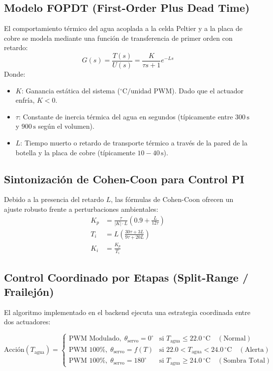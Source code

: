 \documentclass[11pt,letterpaper]{article}
\begin{document}
\subsection{Modelo FOPDT (First-Order Plus Dead Time)}
El comportamiento térmico del agua acoplada a la celda Peltier y a la placa de cobre se modela mediante una función de transferencia de primer orden con retardo:
\begin{equation}
    G(s) = \frac{T(s)}{U(s)} = \frac{K}{\tau s + 1} e^{-L s}
\end{equation}
Donde:
\begin{itemize}
    \item $K$: Ganancia estática del sistema ($^\circ\text{C} / \text{unidad PWM}$). Dado que el actuador enfría, $K < 0$.
    \item $\tau$: Constante de inercia térmica del agua en segundos (típicamente entre $300\,\text{s}$ y $900\,\text{s}$ según el volumen).
    \item $L$: Tiempo muerto o retardo de transporte térmico a través de la pared de la botella y la placa de cobre (típicamente $10 - 40\,\text{s}$).
\end{itemize}

\subsection{Sintonización de Cohen-Coon para Control PI}
Debido a la presencia del retardo $L$, las fórmulas de Cohen-Coon ofrecen un ajuste robusto frente a perturbaciones ambientales:
\begin{align}
    K_p &= \frac{\tau}{|K| \cdot L} \left( 0.9 + \frac{L}{12\tau} \right) \\
    T_i &= L \left( \frac{30\tau + 3L}{9\tau + 20L} \right) \\
    K_i &= \frac{K_p}{T_i}
\end{align}

\subsection{Control Coordinado por Etapas (Split-Range / Frailejón)}
El algoritmo implementado en el backend ejecuta una estrategia coordinada entre dos actuadores:

\begin{equation}
    \text{Acción}(T_{\text{agua}}) = 
    \begin{cases}
        \text{PWM Modulado}, \; \theta_{\text{servo}} = 0^\circ & \text{si } T_{\text{agua}} \le 22.0\,^\circ\text{C} \quad (\text{Normal}) \\
        \text{PWM } 100\%, \; \theta_{\text{servo}} = f(T) & \text{si } 22.0 < T_{\text{agua}} < 24.0\,^\circ\text{C} \quad (\text{Alerta}) \\
        \text{PWM } 100\%, \; \theta_{\text{servo}} = 180^\circ & \text{si } T_{\text{agua}} \ge 24.0\,^\circ\text{C} \quad (\text{Sombra Total})
    \end{cases}
\end{equation}
\end{document}
